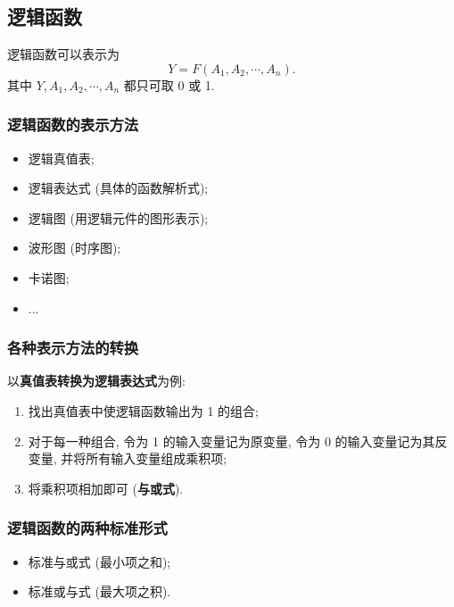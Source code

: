 \subsection{逻辑函数}
逻辑函数可以表示为
\begin{equation}
    Y=F(A_1,A_2,\cdots,A_n).
\end{equation}
其中 $Y,A_1,A_2,\cdots,A_n$ 都只可取 0 或 1.

\subsubsection{逻辑函数的表示方法}
\begin{itemize}
    \item 逻辑真值表;
    \item 逻辑表达式 (具体的函数解析式);
    \item 逻辑图 (用逻辑元件的图形表示);
    \item 波形图 (时序图);
    \item 卡诺图;
    \item ...
\end{itemize}

\subsubsection{各种表示方法的转换}
以\textbf{真值表转换为逻辑表达式}为例:
\begin{enumerate}
    \item 找出真值表中使逻辑函数输出为 1 的组合;
    \item 对于每一种组合, 令为 1 的输入变量记为原变量, 令为 0 的输入变量记为其反变量, 并将所有输入变量组成乘积项;
    \item 将乘积项相加即可 (\textbf{与或式}).
\end{enumerate}

\subsubsection{逻辑函数的两种标准形式}
\begin{itemize}
    \item 标准与或式 (最小项之和);
    \item 标准或与式 (最大项之积).
\end{itemize}

